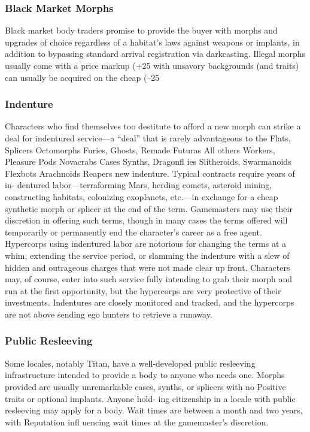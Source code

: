 \subsubsection{Black Market Morphs}

Black market body traders promise to provide the 
buyer with morphs and upgrades of choice regardless 
of a habitat's laws against weapons or implants, in 
addition to bypassing standard arrival registration 
via darkcasting. Illegal morphs usually come with a 
price markup (+25%
with unsavory backgrounds (and traits) can usually be 
acquired on the cheap (–25%

\subsubsection{Indenture}

Characters who find themselves too destitute to 
afford a new morph can strike a deal for indentured 
service—a ``deal'' that is rarely advantageous to the 
Flats, Splicers
Octomorphs
Furies, Ghosts, Remade
Futuras
All others
Workers, Pleasure Pods
Novacrabs
Cases
Synths, Dragonﬂ ies
Slitheroids, Swarmanoids
Flexbots
Arachnoids
Reapers
new indenture. Typical contracts require years of in-
dentured labor—terraforming Mars, herding comets, 
asteroid mining, constructing habitats, colonizing 
exoplanets, etc.—in exchange for a cheap synthetic 
morph or splicer at the end of the term. Gamemasters 
may use their discretion in offering such terms, though 
in many cases the terms offered will temporarily or 
permanently end the character's career as a free agent. 
Hypercorps using indentured labor are notorious for 
changing the terms at a whim, extending the service 
period, or slamming the indenture with a slew of 
hidden and outrageous charges that were not made 
clear up front. Characters may, of course, enter into 
such service fully intending to grab their morph and 
run at the first opportunity, but the hypercorps are 
very protective of their investments. Indentures are 
closely monitored and tracked, and the hypercorps are 
not above sending ego hunters to retrieve a runaway.

\subsubsection{Public Resleeving}

Some locales, notably Titan, have a well-developed 
public resleeving infrastructure intended to provide a 
body to anyone who needs one. Morphs provided are 
usually unremarkable cases, synths, or splicers with 
no Positive traits or optional implants. Anyone hold-
ing citizenship in a locale with public resleeving may 
apply for a body. Wait times are between a month and 
two years, with Reputation infl uencing wait times at 
the gamemaster's discretion.

